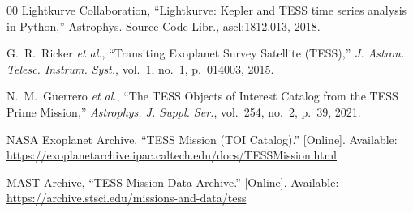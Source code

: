 \documentclass[conference]{IEEEtran}
\begin{document}
\begin{thebibliography}{00}
 Lightkurve Collaboration, ``Lightkurve: Kepler and TESS time
series analysis in Python,'' Astrophys. Source Code Libr., ascl:1812.013, 2018.

 G.~R.~Ricker \emph{et al.}, ``Transiting Exoplanet Survey
Satellite (TESS),'' \emph{J. Astron. Telesc. Instrum. Syst.}, vol.~1, no.~1,
p.~014003, 2015.

 N.~M.~Guerrero \emph{et al.}, ``The TESS Objects of
Interest Catalog from the TESS Prime Mission,'' \emph{Astrophys. J. Suppl. Ser.},
vol.~254, no.~2, p.~39, 2021.

 NASA Exoplanet Archive, ``TESS Mission (TOI Catalog).'' [Online].
Available: \url{https://exoplanetarchive.ipac.caltech.edu/docs/TESSMission.html}

 MAST Archive, ``TESS Mission Data Archive.'' [Online]. Available:
\url{https://archive.stsci.edu/missions-and-data/tess}

\end{thebibliography}
\end{document}
